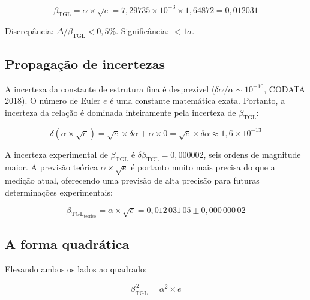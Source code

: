 \documentclass[12pt,a4paper,twoside]{article}
\newcommand{\betatgl}{\beta_{\!\scriptscriptstyle\mathrm{TGL}}}
\begin{document}
\begin{resultbox}[title={Resultado Central}]
\begin{equation}
\betatgl = \alpha \times \sqrt{e} = 7{,}29735 \times 10^{-3} \times 1{,}64872 = 0{,}012031
\label{eq:resultado_central}
\end{equation}

\noindent Discrepância: $\Delta/\betatgl < 0{,}5\%$. Significância: $< 1\sigma$.
\end{resultbox}

\subsection{Propagação de incertezas}

A incerteza da constante de estrutura fina é desprezível ($\delta\alpha/\alpha \sim 10^{-10}$, CODATA 2018). O número de Euler $e$ é uma constante matemática exata. Portanto, a incerteza da relação é dominada inteiramente pela incerteza de $\betatgl$:

\begin{equation}
\delta(\alpha \times \sqrt{e}) = \sqrt{e} \times \delta\alpha + \alpha \times 0 = \sqrt{e} \times \delta\alpha \approx 1{,}6 \times 10^{-13}
\end{equation}

A incerteza experimental de $\betatgl$ é $\delta\betatgl = 0{,}000002$, seis ordens de magnitude maior. A previsão teórica $\alpha \times \sqrt{e}$ é portanto muito mais precisa do que a medição atual, oferecendo uma previsão de alta precisão para futuras determinações experimentais:

\begin{equation}
\betatgl_{\text{teórico}} = \alpha \times \sqrt{e} = 0{,}012\,031\,05 \pm 0{,}000\,000\,02
\label{eq:previsao}
\end{equation}

\subsection{A forma quadrática}

Elevando ambos os lados ao quadrado:

\begin{equationbox}[title={Forma Quadrática}]
\begin{equation}
\boxed{\betatgl^{\,2} = \alpha^2 \times e}
\label{eq:quadratica}
\end{equation}
\end{equationbox}
\end{document}
